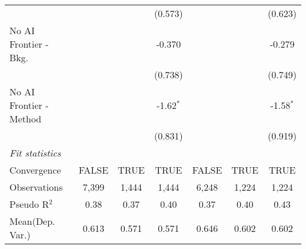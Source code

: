 \begin{tabular}{lcccccc}
                           &               &         & (0.573)      &               &         & (0.623)\\   
   No AI Frontier - Bkg.   &               &         & -0.370       &               &         & -0.279\\   
                           &               &         & (0.738)      &               &         & (0.749)\\   
   No AI Frontier - Method &               &         & -1.62$^{*}$  &               &         & -1.58$^{*}$\\   
                           &               &         & (0.831)      &               &         & (0.919)\\   
   \midrule
   \emph{Fit statistics}\\
   Convergence             &FALSE          & TRUE    & TRUE         & FALSE         & TRUE    & TRUE\\  
   Observations            & 7,399         & 1,444   & 1,444        & 6,248         & 1,224   & 1,224\\  
   Pseudo R$^2$            & 0.38          & 0.37    & 0.40         & 0.37          & 0.40    & 0.43\\  
Mean(Dep. Var.) & 0.613 & 0.571 & 0.571 & 0.646 & 0.602 & 0.602 \\
   

\end{tabular}
